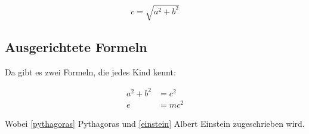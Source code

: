 \documentclass[ 12pt, a4paper, parskip=full]{scrartcl}
\begin{document}
\begin{displaymath}
  c=\sqrt{a^2+b^2} 
\end{displaymath}


\subsection{Ausgerichtete Formeln}
Da gibt es zwei Formeln, die jedes Kind kennt: 

\begin{align}
  a^2 + b^2 &= c^2     \label{pythagoras}  \\  
  e &= m c^2           \label{einstein}  
\end{align}

Wobei \eqref{pythagoras} Pythagoras und \eqref{einstein} Albert Einstein zugeschrieben wird.
\end{document}
